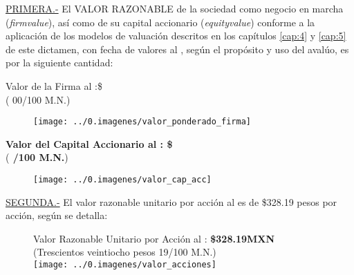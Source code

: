 \textcolor{principal}{\underline{PRIMERA.-}} El \textcolor{principal}{VALOR RAZONABLE} de la sociedad \textcolor{principal}{\empresaSolicitante} como negocio en marcha (\textit{\gls{firmvalue}}), as\'i como de su capital accionario (\textit{\gls{equityvalue}}) conforme a la aplicaci\'on de los modelos de valuaci\'on descritos en los cap\'itulos \ref{cap:4} y \ref{cap:5}  de este dictamen, con fecha de valores al \fechaValores, seg\'un el prop\'osito y uso del aval\'uo, es por la siguiente cantidad:\\
\begin{center}
\textcolor{principal}{Valor de la Firma al \fechaValoresCorto:}\$\valorFirma{} \monedaCode\\

(\textcolor{secundario}{\valorFirmaLetra{} \moneda{} 00/100 M.N.})

\begin{figure}[H]
\centering
\texttt{[image: ../0.imagenes/valor\_ponderado\_firma]}
\end{figure}


\textbf{\textcolor{principal}{Valor del Capital Accionario al \fechaValoresCorto:} \$\valorCapital{} \monedaCode}\\
(\textbf{\textcolor{secundario}{\valorCapitalLetra{} /100 M.N.}})\\
\end{center}

\begin{figure}[H]
\centering
 \texttt{[image: ../0.imagenes/valor\_cap\_acc]}

\end{figure}
\espacio{.5cm}


\textcolor{principal}{\underline{SEGUNDA.-}} El valor razonable unitario por acción al \textcolor{principal}{\fechaValoresCorto}  es de \$328.19 pesos por acción, según se detalla:
\begin{figure}[H]
\centering

\textcolor{principal}{Valor Razonable Unitario por Acción al \fechaValoresCorto:} \textbf{\$328.19MXN}\\[5pt]
(\textcolor{secundario}{Trescientos veintiocho pesos 19/100 M.N.})\\[10pt]

 \texttt{[image: ../0.imagenes/valor\_acciones]}

\end{figure}


\vspace{2cm}